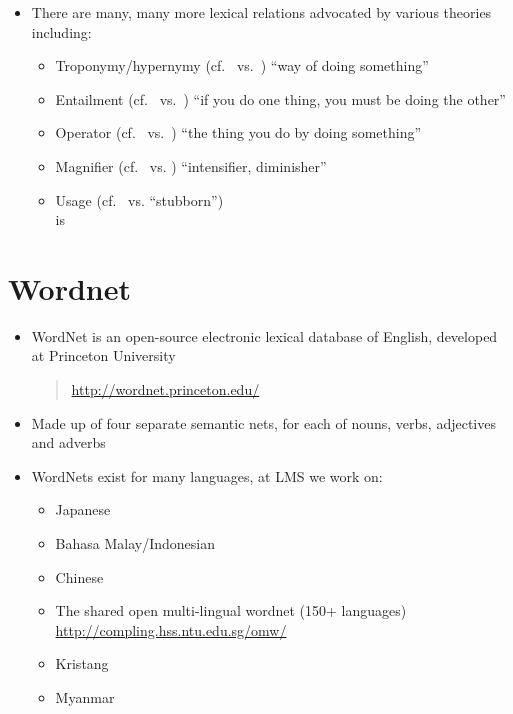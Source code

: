 \documentclass[a4paper,landscape,headrule,footrule,xetex]{foils}
\begin{document}
\MyLogo{}
\begin{itemize}
\item There are many, many more lexical relations advocated by various
  theories including:
  \begin{itemize}
  \item Troponymy/hypernymy (cf.\  vs.\ ) 
    ``way of doing something''
  \item Entailment (cf.\  vs.\ ) ``if you do one thing, you must be doing the other''
  \item Operator (cf.\  vs.\ )
    ``the thing you do by doing something''
  \item Magnifier (cf.\  vs. )
    ``intensifier, diminisher''
  \item Usage (cf.\  vs.  ``stubborn'')
    \\  is 
  \end{itemize}
\end{itemize}


\section{Wordnet}



\begin{itemize}
\item WordNet is an open-source electronic lexical database of English,
  developed at Princeton University
  \begin{quote}
    \url{http://wordnet.princeton.edu/}
  \end{quote}
\item Made up of four separate semantic nets, for each of nouns, verbs,
  adjectives and adverbs
\item WordNets exist for many languages, at LMS we work on:
  \begin{itemize}
  \item Japanese 
  \item Bahasa Malay/Indonesian
  \item Chinese
  \item The shared open multi-lingual wordnet (150+ languages) 
    \\ \url{http://compling.hss.ntu.edu.sg/omw/}
  \item Kristang
  \item Myanmar
\end{itemize}
\end{itemize}
\end{document}
